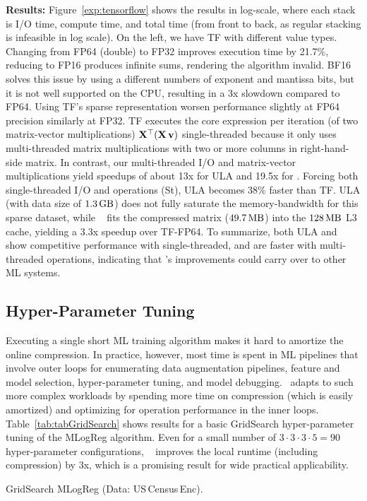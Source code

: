 \textbf{Results:} Figure~\ref{exp:tensorflow} shows the results in log-scale, where each stack is I/O time,
compute time, and total time (from front to back, as regular stacking is infeasible in log scale).
On the left, we have TF with different value types.
Changing from FP64 (double) to FP32 improves execution time by 21.7\%, reducing to FP16 produces infinite sums, rendering the algorithm invalid.
BF16 solves this issue by using a different numbers of exponent and mantissa bits, but it is not well supported on the CPU,
resulting in a 3x slowdown compared to FP64.
Using TF's sparse representation worsen performance slightly at FP64 precision similarly at FP32.
TF executes the core expression per iteration (of two matrix-vector multiplications) $\mathbf{X}^{\top}(\mathbf{X}\,\mathbf{v})$ single-threaded because it only uses multi-threaded matrix multiplications with two or more columns in right-hand-side matrix.
In contrast, our multi-threaded I/O and matrix-vector multiplications yield speedups of about 13x for ULA and 19.5x for \name. 
Forcing both single-threaded I/O and operations (St), ULA becomes 38\% faster than TF.
ULA (with data size of $1.3\gb$) does not fully saturate the memory-bandwidth for this sparse dataset,
while \name~ fits the compressed matrix ($49.7\mb$) into the $128\mb$ L3 cache, yielding a 3.3x speedup over TF-FP64.
To summarize, both ULA and \name~ show competitive performance with single-threaded, and are faster with multi-threaded operations,
indicating that \name's improvements could carry over to other ML systems.

\subsection{Hyper-Parameter Tuning}

Executing a single short ML training algorithm makes it hard to amortize the online compression. In practice, however, most time is spent in ML pipelines that involve outer loops for enumerating data augmentation pipelines, feature and model selection, hyper-parameter tuning, and model debugging. \name\ adapts to such more complex workloads by spending more time on compression (which is easily amortized) and optimizing for operation performance in the inner loops. Table~\ref{tab:tabGridSearch} shows results for a basic GridSearch hyper-parameter tuning of the MLogReg algorithm. Even for a small number of $3\cdot3\cdot3\cdot5 = 90$ hyper-parameter configurations, \name~ improves the local runtime (including compression) by 3x, which is a promising result for wide practical applicability.

\begin{table} [!t] \setlength\tabcolsep{10pt}
	\centering
	\caption{\label{tab:tabGridSearch}GridSearch MLogReg (Data: US\,Census\,Enc).}
	\vspace{-0.4cm}
	

\end{table}
